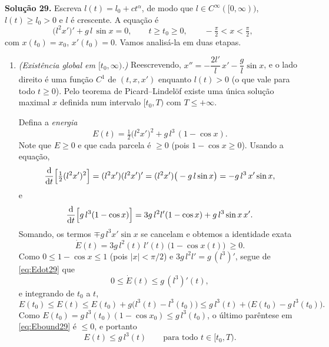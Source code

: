 \bigskip\noindent\textbf{Solução 29.}\quad
Escreva $l(t)=l_0+ct^{\alpha}$, de modo que $l\in C^\infty([0,\infty))$, $l(t)\ge l_0>0$ e $l$ é crescente. A equação é
\[
\big(l^2 x'\big)'+g\,l\,\sin x=0,\qquad t\ge t_0\ge 0,\qquad -\tfrac\pi2<x<\tfrac\pi2,
\]
com $x(t_0)=x_0$, $x'(t_0)=0$. Vamos analisá-la em duas etapas.

\begin{enumerate}[label=(\alph*)]

\item \emph{(Existência global em $[t_0,\infty)$.)} Reescrevendo, $x''=-\dfrac{2l'}{l}\,x'-\dfrac{g}{l}\sin x$, e o lado direito é uma função $C^1$ de $(t,x,x')$ enquanto $l(t)>0$ (o que vale para todo $t\ge0$). Pelo teorema de Picard--Lindelöf existe uma única solução maximal $x$ definida num intervalo $[t_0,T)$ com $T\le+\infty$.

Defina a \emph{energia}
\[
E(t)=\tfrac12\big(l^2 x'\big)^2+g\,l^3\,(1-\cos x).
\]
Note que $E\ge0$ e que cada parcela é $\ge0$ (pois $1-\cos x\ge0$). Usando a equação,
\[
\frac{\mathrm{d}}{\mathrm{d} t}\Big[\tfrac12(l^2x')^2\Big]
=(l^2x')(l^2x')'=(l^2x')\big(-g\,l\sin x\big)=-g\,l^3\,x'\sin x,
\]
e
\[
\frac{\mathrm{d}}{\mathrm{d} t}\Big[g\,l^3(1-\cos x)\Big]
=3g\,l^2 l'(1-\cos x)+g\,l^3\sin x\,x'.
\]
Somando, os termos $\mp g\,l^3 x'\sin x$ se cancelam e obtemos a identidade exata
\begin{equation}\label{eq:Edot29}
\dot E(t)=3g\,l^2(t)\,l'(t)\,\big(1-\cos x(t)\big)\ \ge 0 .
\end{equation}
Como $0\le 1-\cos x\le 1$ (pois $|x|<\pi/2$) e $3g\,l^2l'=g\,(l^3)'$, segue de \eqref{eq:Edot29} que
\[
0\le \dot E(t)\le g\,(l^3)'(t),
\]
e integrando de $t_0$ a $t$,
\begin{equation}\label{eq:Ebound29}
E(t_0)\le E(t)\le E(t_0)+g\big(l^3(t)-l^3(t_0)\big)\le g\,l^3(t)+\big(E(t_0)-g\,l^3(t_0)\big).
\end{equation}
Como $E(t_0)=g\,l^3(t_0)(1-\cos x_0)\le g\,l^3(t_0)$, o último parêntese em \eqref{eq:Ebound29} é $\le0$, e portanto
\begin{equation}\label{eq:Ebound29b}
E(t)\le g\,l^3(t)\qquad\text{para todo }t\in[t_0,T).
\end{equation}


\end{enumerate}

